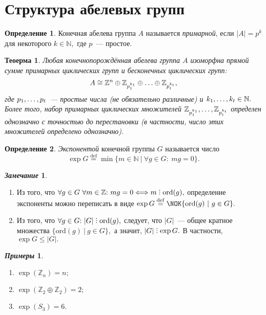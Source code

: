 \documentclass[a4paper, 14pt]{extarticle}
\newcommand{\deq}{\stackrel{\mathrm{def}}{=}}
\newcommand{\integers}{\mathbb{Z}}
\newcommand{\naturals}{\mathbb{N}}
\newcommand{\ord}{\mathrm{ord}}
\DeclareRobustCommand{\divby}{%
	\mathrel{\text{\vbox{\baselineskip.65ex\lineskiplimit0pt\hbox{.}\hbox{.}\hbox{.}}}}%
}
\theoremstyle{definition}
\newtheorem*{exmpls}{\textit{Примеры}}
\newtheorem*{remark}{\textit{Замечание}}
\newtheorem{definition}{Определение}
\theoremstyle{plain}
\newtheorem{theorem}{Теоерма}
\numberwithin{theorem}{section}
\numberwithin{definition}{section}
\numberwithin{statement}{section}
\numberwithin{lemma}{section}
\numberwithin{consequence}{section}
\begin{document}
        \section{Структура абелевых групп}
        \setcounter{definition}{0}
	\begin{definition}
		Конечная абелева группа $A$ называется \textit{примарной}, если ${|A| = p^k}$ для некоторого ${k \in \naturals,}$ где $p$~--- простое.
	\end{definition}
	\begin{theorem}
        Любая конечнопорождённая абелева группа $A$
        изоморфна прямой сумме примарных циклических групп и бесконечных циклических групп: 
        \begin{equation*}
            A \cong \integers^n \oplus \integers_{p^{k_1}_1} \oplus \mathellipsis \oplus \integers_{p^{k_t}_t},
        \end{equation*}
        где ${p_1, \mathellipsis, p_t}$~--- простые числа (не обязательно различные) и ${k_1, \mathellipsis, k_t \in \naturals.}$ Более того, набор примарных циклических множителей ${\integers_{p^{k_1}_1}, \mathellipsis, \integers_{p^{k_t}_t}}$ определен однозначно с точностью до перестановки (в частности, число этих множителей определено однозначно).
	\end{theorem}
	\begin{definition}
		\textit{Экспонентой} конечной группы $G$ называется число
		\begin{equation*}
			\exp G \deq \min \{m \in \naturals \ | \ \forall g \in G{:} \ mg = 0\}.
		\end{equation*}
	\end{definition}
	\begin{remark}
		\
		\begin{enumerate}
			\setlength\itemsep{0.1em}
			\item Из того, что ${\forall g \in G \  \forall m \in \integers{:} \ mg = 0 \Longleftrightarrow m \divby \ord(g),}$ определение экспоненты можно переписать в виде ${\exp G \deq \NOK \{\ord(g) \ | \ g \in G\}.}$
			\item Из того, что ${\forall g \in G{:} \ |G| \divby \ord(g),}$ следует, что $|G|$~--- общее кратное
			множества ${\{\ord(g) \ | \ g \in G\},}$ а значит, ${|G| \divby \exp G.}$ В частности,
			${\exp G \leqslant |G|.}$
		\end{enumerate}
	\end{remark}
        \begin{exmpls}
            \
            \begin{enumerate}
            \setlength\itemsep{0.1em}
                \item $\exp(\integers_n) = n;$
                \item $\exp(\integers_2 \oplus \integers_2) = 2;$
                \item $\exp(S_3) = 6.$
            \end{enumerate}
        \end{exmpls}
\end{document}
